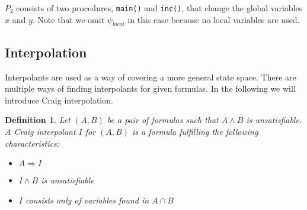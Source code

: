 \documentclass{article}
\newtheorem{mydef}{Definition}
\newcommand\mycom[1]{}
\newcommand\mycom[1]{#1}
\newcommand{\jw}[1]{\mycom{\todo[color=blue!40,inline]{\small JW: #1}}}
\begin{document}
\begin{minipage}{.6\textwidth}
		\label{fig:rect}
	\end{minipage}%
	
	\pagebreak
	$P_2$ consists of two procedures, \texttt{main()} and \texttt{inc()}, that change the global variables $x$ and $y$. Note that we omit $\psi_{local}$ in this case because no local variables are used.
	\jw{more details + example with local vars.}
	
	
	\pagebreak
	
	
	\subsection{Interpolation}
	Interpolants are used as a way of covering a more general state space. There are multiple ways of finding interpolants for given formulas.
	In the following we will introduce Craig interpolation. 
	\jw{citation needed}
	
	\begin{mydef}
		Let $(A, B)$ be a pair of formulas such that $A \land B$ is unsatisfiable. A Craig interpolant $I$ for $(A, B)$ is a formula fulfilling the following characteristics:
		\begin{itemize}
			\item $A \Rightarrow I$
			\item $I \land B$ is unsatisfiable
			\item $I$ consists only of variables found in $A \cap B$
		\end{itemize}
	\end{mydef}
\end{document}
